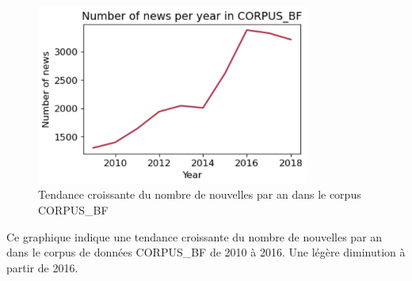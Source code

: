 \documentclass{article}
\begin{document}
\begin{figure}[h]
    \centering
    \includegraphics[width=0.8\textwidth]{nbrArticlesAn.png}
    \caption{Tendance croissante du nombre de nouvelles par an dans le corpus CORPUS_BF}
    \label{fig:nbr_articles_an}
\end{figure}
\vspace{6cm}

Ce graphique indique une tendance croissante du nombre de nouvelles par an dans le corpus de données CORPUS_BF de 2010 à 2016. Une légère diminution à partir de 2016.
\end{document}
